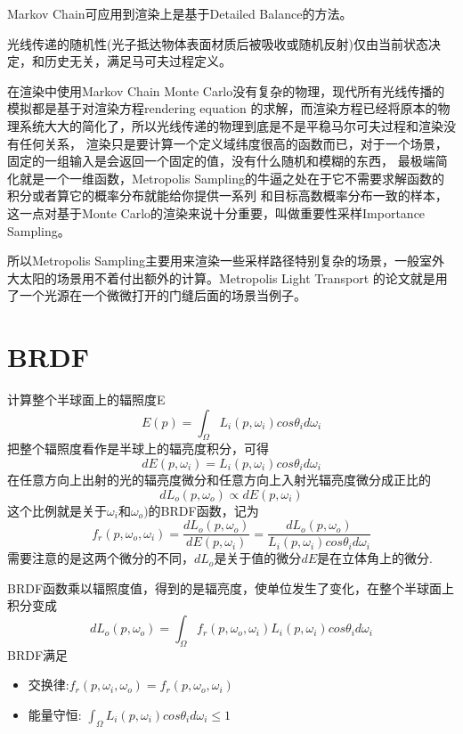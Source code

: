 Markov Chain可应用到渲染上是基于Detailed Balance的方法。

光线传递的随机性(光子抵达物体表面材质后被吸收或随机反射)仅由当前状态决定，和历史无关，满足马可夫过程定义。

在渲染中使用Markov Chain Monte Carlo没有复杂的物理，现代所有光线传播的模拟都是基于对渲染方程rendering equation
的求解，而渲染方程已经将原本的物理系统大大的简化了，所以光线传递的物理到底是不是平稳马尔可夫过程和渲染没有任何关系，
渲染只是要计算一个定义域纬度很高的函数而已，对于一个场景，固定的一组输入是会返回一个固定的值，没有什么随机和模糊的东西，
最极端简化就是一个一维函数，Metropolis Sampling的牛逼之处在于它不需要求解函数的积分或者算它的概率分布就能给你提供一系列
和目标高数概率分布一致的样本，这一点对基于Monte Carlo的渲染来说十分重要，叫做重要性采样Importance Sampling。

所以Metropolis Sampling主要用来渲染一些采样路径特别复杂的场景，一般室外大太阳的场景用不着付出额外的计算。Metropolis Light Transport
的论文就是用了一个光源在一个微微打开的门缝后面的场景当例子。

\section{BRDF}

计算整个半球面上的辐照度E
$$
E(p)=\int_{\Omega}L_{i}(p,{\omega}_{i})cos{\theta}_{i}d{\omega}_{i}
$$
把整个辐照度看作是半球上的辐亮度积分，可得
$$
dE(p,{\omega}_{i})=L_{i}(p,{\omega}_{i})cos{\theta}_{i}d{\omega}_{i}
$$
在任意方向上出射的光的辐亮度微分和任意方向上入射光辐亮度微分成正比的
$$
dL_{o}(p,{\omega}_{o}) \propto dE(p,{\omega}_{i}) 
$$
这个比例就是关于${\omega}_{i}$和${\omega}_{o}) $的BRDF函数，记为
$$
f_{r}(p,{\omega}_{o},{\omega}_{i})
=\frac{dL_{o}(p,{\omega}_{o})}{dE(p,{\omega}_{i})}
=\frac{dL_{o}(p,{\omega}_{o})}{L_{i}(p,{\omega}_{i})cos{\theta}_{i}d{\omega}_{i}}
$$
需要注意的是这两个微分的不同，$dL_{o}$是关于值的微分$dE$是在立体角上的微分.

BRDF函数乘以辐照度值，得到的是辐亮度，使单位发生了变化，在整个半球面上积分变成
$$
dL_{o}(p,{\omega}_{o})=\int_{\Omega}f_{r}(p,{\omega}_{o},{\omega}_{i})L_{i}(p,{\omega}_{i})cos{\theta}_{i}d{\omega}_{i}
$$
BRDF满足
\begin{itemize}
    \item {交换律:$f_{r}(p,{\omega}_{i},{\omega}_{o})=f_{r}(p,{\omega}_{o},{\omega}_{i})$}
    \item {能量守恒: $\int_{\Omega}L_{i}(p,{\omega}_{i})cos{\theta}_{i}d{\omega}_{i} \leq 1$}
\end{itemize}


